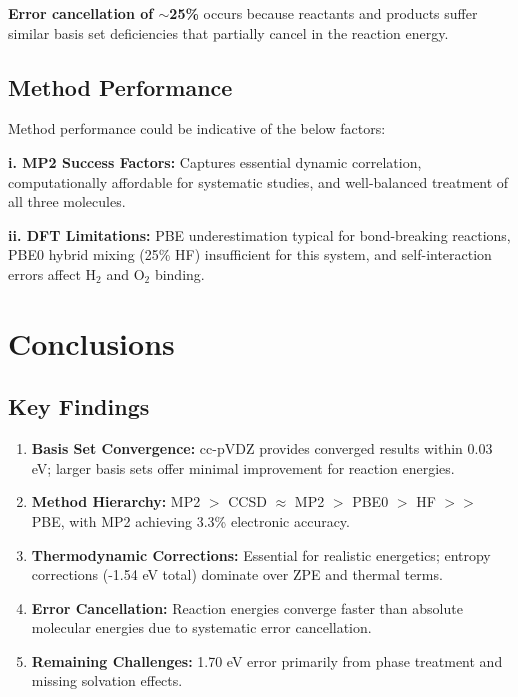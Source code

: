 \documentclass{template}
\begin{document}
\textbf{Error cancellation of $\sim$25\%} occurs because reactants and products suffer similar basis set deficiencies that partially cancel in the reaction energy.

\subsection{Method Performance}
Method performance could be indicative of the below factors:

\textbf{i. MP2 Success Factors:} Captures essential dynamic correlation, computationally affordable for systematic studies, and well-balanced treatment of all three molecules.

\textbf{ii. DFT Limitations:} PBE underestimation typical for bond-breaking reactions, PBE0 hybrid mixing (25\% HF) insufficient for this system, and self-interaction errors affect H$_2$ and O$_2$ binding.

\section{Conclusions}

\subsection{Key Findings}

\begin{enumerate}
\item \textbf{Basis Set Convergence:} cc-pVDZ provides converged results within 0.03 eV; larger basis sets offer minimal improvement for reaction energies.

\item \textbf{Method Hierarchy:} MP2 $>$ CCSD $\approx$ MP2 $>$ PBE0 $>$ HF $>>$ PBE, with MP2 achieving 3.3\% electronic accuracy.

\item \textbf{Thermodynamic Corrections:} Essential for realistic energetics; entropy corrections (-1.54 eV total) dominate over ZPE and thermal terms.

\item \textbf{Error Cancellation:} Reaction energies converge faster than absolute molecular energies due to systematic error cancellation.

\item \textbf{Remaining Challenges:} 1.70 eV error primarily from phase treatment and missing solvation effects.
\end{enumerate}
\end{document}
